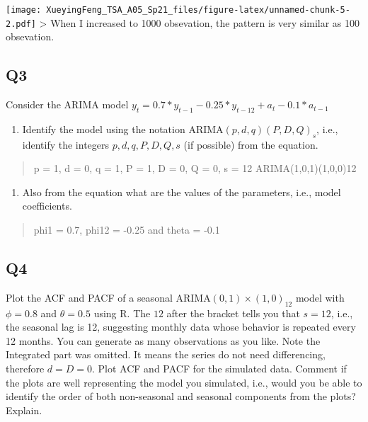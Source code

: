 \documentclass[
]{article}
\providecommand{\tightlist}{%
  \setlength{\itemsep}{0pt}\setlength{\parskip}{0pt}}
\begin{document}
\texttt{[image: XueyingFeng\_TSA\_A05\_Sp21\_files/figure-latex/unnamed-chunk-5-2.pdf]}
\textgreater{} When I increased to 1000 obsevation, the pattern is very
similar as 100 obsevation.

\hypertarget{q3}{%
\subsection{Q3}\label{q3}}

Consider the ARIMA model
\(y_t=0.7*y_{t-1}-0.25*y_{t-12}+a_t-0.1*a_{t-1}\)

\begin{enumerate}
\def\labelenumi{(\alph{enumi})}
\tightlist
\item
  Identify the model using the notation ARIMA\((p,d,q)(P,D,Q)_ s\),
  i.e., identify the integers \(p,d,q,P,D,Q,s\) (if possible) from the
  equation.
\end{enumerate}

\begin{quote}
p = 1, d = 0, q = 1, P = 1, D = 0, Q = 0, s = 12 ARIMA(1,0,1)(1,0,0)12
\end{quote}

\begin{enumerate}
\def\labelenumi{(\alph{enumi})}
\setcounter{enumi}{1}
\tightlist
\item
  Also from the equation what are the values of the parameters, i.e.,
  model coefficients.
\end{enumerate}

\begin{quote}
phi1 = 0.7, phi12 = -0.25 and theta = -0.1
\end{quote}

\hypertarget{q4}{%
\subsection{Q4}\label{q4}}

Plot the ACF and PACF of a seasonal ARIMA\((0, 1)\times(1, 0)_{12}\)
model with \(\phi =0 .8\) and \(\theta = 0.5\) using R. The \(12\) after
the bracket tells you that \(s=12\), i.e., the seasonal lag is 12,
suggesting monthly data whose behavior is repeated every 12 months. You
can generate as many observations as you like. Note the Integrated part
was omitted. It means the series do not need differencing, therefore
\(d=D=0\). Plot ACF and PACF for the simulated data. Comment if the
plots are well representing the model you simulated, i.e., would you be
able to identify the order of both non-seasonal and seasonal components
from the plots? Explain.
\end{document}
